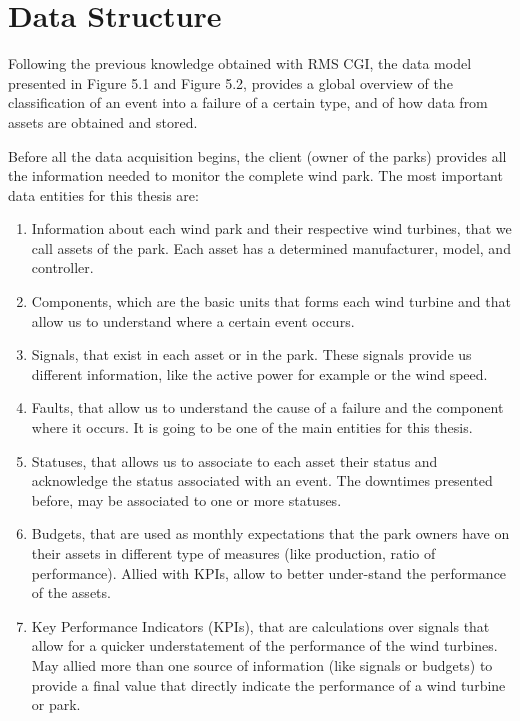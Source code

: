 \section{Data Structure} 
\label{sub:if_you_use_this_template} 

Following the previous knowledge obtained with RMS CGI, the data model presented in Figure 5.1 and Figure 5.2, provides a global overview of the classification of an event into a failure of a certain type, and of how data from assets are obtained and stored.

Before all the data acquisition begins, the client (owner of the parks) provides all the information needed to monitor the complete wind park. The most important data entities for this thesis are:

\begin{enumerate}
    \item 
Information about each wind park and their respective wind turbines, that we call assets of the park. Each asset has a determined manufacturer, model, and controller.
    \item
Components, which are the basic units that forms each wind turbine and that allow us to understand where a certain event occurs.
    \item
Signals, that exist in each asset or in the park. These signals provide us different information, like the active power for example or the wind speed.
    \item
Faults, that allow us to understand the cause of a failure and the component where it occurs. It is going to be one of the main entities for this thesis.
    \item
Statuses, that allows us to associate to each asset their status and acknowledge the status associated with an event. The downtimes presented before, may be associated to one or more statuses.
    \item
Budgets, that are used as monthly expectations that the park owners have on their assets in different type of measures (like production, ratio of performance). Allied with KPIs, allow to better under-stand the performance of the assets.
    \item
Key Performance Indicators (KPIs), that are calculations over signals that allow for a quicker understatement of the performance of the wind turbines. May allied more than one source of information (like signals or budgets) to provide a final value that directly indicate the performance of a wind turbine or park.
\end{enumerate}

